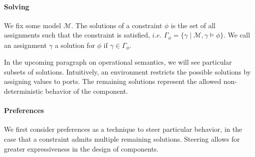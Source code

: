 \paragraph{Solving} 
We fix some model $\mathcal{M}$.
The solutions of a constraint $\phi$ is the set of all assignments such that the constraint is satisfied,
$i.e.$ $\Gamma_{\phi} = \{ \gamma \mid \mathcal{M},\gamma \models \phi \}$.
We call an assignment $\gamma$ a solution for $\phi$ if $\gamma\in\Gamma_{\phi}$.

In the upcoming paragraph on operational semantics, we will see particular subsets of solutions.
Intuitively, an environment restricts the possible solutions by assigning values to ports.
The remaining solutions represent the allowed non-deterministic behavior of the component.





\paragraph{Preferences} 
We first consider preferences as a technique to steer particular behavior,
in the case that a constraint admits multiple remaining solutions.
Steering allows for greater expressiveness in the design of components.

